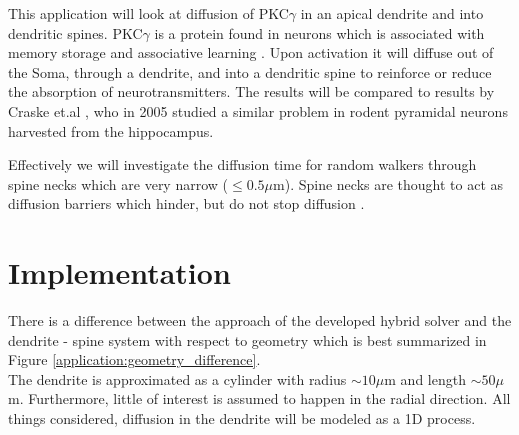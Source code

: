 \noindent This application will look at diffusion of PKC$\gamma$ in an apical dendrite and into dendritic spines. 
PKC$\gamma$ is a protein found in neurons which is associated with memory storage and associative learning \cite{saito2002protein}. 
Upon activation it will diffuse out of the Soma, through a dendrite, and into a dendritic spine to reinforce or reduce the absorption of neurotransmitters. 
The results will be compared to results by Craske et.al \cite{craske2005spines}, who in 2005 studied a similar problem in rodent pyramidal neurons harvested from the hippocampus.

Effectively we will investigate the diffusion time for random walkers through spine necks which are very narrow ($\leq0.5\mu$m). Spine necks are thought to act as diffusion barriers which hinder, but do not stop diffusion \cite{craske2005spines}.

\section{Implementation}

There is a difference between the approach of the developed hybrid solver and the dendrite - spine system with respect to geometry which is best summarized in Figure \ref{application:geometry_difference}.\\

\noindent The dendrite is approximated as a cylinder with radius $\sim10\mu$m and length $\sim50\mu$m. Furthermore, little of interest is assumed to happen in the radial direction. All things considered, diffusion in the dendrite will be modeled as a 1D process. \\

